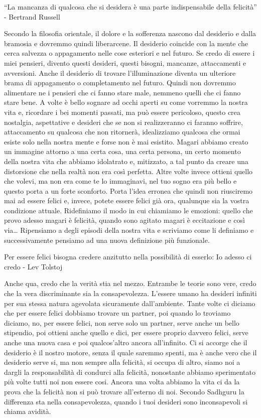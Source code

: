 \documentclass[12pt]{book} %
\begin{document}
“La mancanza di qualcosa che si desidera è una parte indispensabile della felicità” - Bertrand Russell

Secondo la filosofia orientale, il dolore e la sofferenza nascono dal desiderio e dalla bramosia e dovremmo quindi
liberarcene. Il desiderio coincide con la mente che cerca salvezza o appagamento nelle cose esteriori e nel futuro. Se
credo di essere i miei pensieri, divento questi desideri, questi bisogni, mancanze, attaccamenti e avversioni. Anche il
desiderio di trovare l'illuminazione diventa un ulteriore brama di appagamento o completamento nel
futuro. Quindi non dovremmo alimentare ne i pensieri che ci fanno stare male, nemmeno quelli che ci fanno stare bene. A
volte è bello sognare ad occhi aperti su come vorremmo la nostra vita e, ricordare i bei momenti passati, ma può essere
pericoloso, questo crea nostalgia, aspettative e desideri che se non si realizzeranno ci faranno soffrire, attaccamento
su qualcosa che non ritornerà, idealizziamo qualcosa che ormai esiste solo nella nostra mente e forse non è mai
esistito. Magari abbiamo creato un immagine attorno a una certa cosa, una certa persona, un certo momento della nostra
vita che abbiamo idolatrato e, mitizzato, a tal punto da creare una distorsione che nella realtà non era così perfetta.
Altre volte invece ottieni quello che volevi, ma non era come te lo immaginavi, nel tuo sogno era più bello e questo
porta a un forte sconforto. Porta l'idea erronea che quindi non riusciremo mai ad essere felici e, invece, potete
essere felici già ora, qualunque sia la vostra condizione attuale. Ridefiniamo il modo in cui chiamiamo le emozioni:
quello che provo adesso magari è felicità, quando sono agitato magari è eccitazione e così via… Ripensiamo a degli
episodi della nostra vita e scriviamo come li definiamo e successivamente pensiamo ad una nuova definizione più
funzionale.

Per essere felici bisogna credere anzitutto nella possibilità di esserlo: Io adesso ci credo - Lev Tolstoj 

Anche qua, credo che la verità stia nel mezzo. Entrambe le teorie sono vere, credo che la vera discriminante sia la
consapevolezza. L'essere umano ha desideri infiniti per sua stessa natura agevolata sicuramente
dall'ambiente. Tante volte ci diciamo che per essere felici dobbiamo trovare un partner, poi
quando lo troviamo diciamo, no, per essere felici, non serve solo un partner, serve anche un bello stipendio, poi
ottieni anche quello e dici, per essere proprio davvero felici, serve anche una nuova casa e poi
qualcos'altro ancora all'infinito. Ci si accorge che il desiderio è il nostro
motore, senza il quale saremmo spenti, ma è anche vero che il desiderio serve si, ma non sempre alla felicità, si
occupa di altro, siamo noi a dargli la responsabilità di condurci alla felicità, nonostante abbiamo sperimentato più
volte tutti noi non essere cosi. Ancora una volta abbiamo la vita ci da la prova che la felicità non si può trovare
all'esterno di noi. Secondo Sadhguru la differenza sta nella consapevolezza, quando i tuoi
desideri sono inconsapevoli si chiama avidità. 
\end{document}
